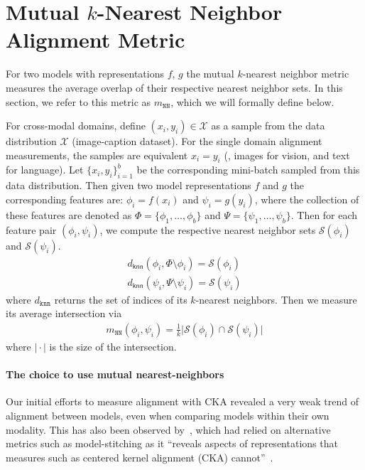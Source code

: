 \appendix

\section{Mutual $k$-Nearest Neighbor Alignment Metric}\label{sec:align-metric}
For two models with representations $f$, $g$ the mutual $k$-nearest neighbor metric measures the average overlap of their respective nearest neighbor sets. In this section, we refer to this metric as $m_{\texttt{NN}}$, which we will formally define below.

For cross-modal domains, define $(x_i, y_i) \in \mathcal{X}$ as a sample from the data distribution $\mathcal{X}$ (\eg image-caption dataset). For the single domain alignment measurements, the samples are equivalent $x_i = y_i$ (\eg, images for vision, and text for language). 
Let $\{x_i, y_i\}_{i=1}^{b}$ be the corresponding mini-batch sampled from this data distribution. Then given two model representations $f$ and $g$ the corresponding features are:
$\phi_i =f(x_i)$ and $\psi_i =g(y_i)$, where the collection of these features are denoted as $\Phi = \{ \phi_1, \dots, \phi_b \}$ and $\Psi = \{ \psi_1, \dots, \psi_b \}$. 
Then for each feature pair $(\phi_i, \psi_i)$, we compute the respective nearest neighbor sets $\mathcal{S}(\phi_i)$ and $\mathcal{S}(\psi_i)$. 
\begin{align}
d_{\mathsf{knn}}(\phi_i, \Phi \setminus \phi_i) =  \mathcal{S}(\phi_i) \\
d_{\mathsf{knn}}(\psi_i, \Psi \setminus \psi_i) =  \mathcal{S}(\psi_i)
\end{align}
where $d_{\texttt{knn}}$ returns the set of indices of its $k$-nearest neighbors. Then we measure its average intersection via
\begin{align}
m_{\texttt{NN}}(\phi_i, \psi_i) = \frac{1}{k} \lvert \mathcal{S}(\phi_i) \cap \mathcal{S}(\psi_i) \rvert
\end{align}
where $\lvert {}\cdot{} \rvert$ is the size of the intersection.

\paragraph{The choice to use mutual nearest-neighbors}

Our initial efforts to measure alignment with CKA revealed a very weak trend of alignment between models, even when comparing models within their own modality. This has also been observed by~\cite{bansal2021revisiting}, which had relied on alternative metrics such as model-stitching as it ``reveals aspects of representations that measures such as centered kernel alignment (CKA) cannot''~\cite{bansal2021revisiting}.

